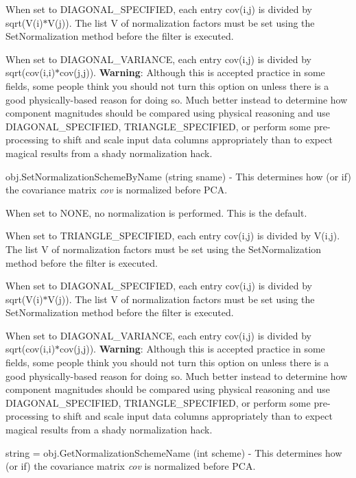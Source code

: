 \begin{DoxyItemize}
When set to D\-I\-A\-G\-O\-N\-A\-L\-\_\-\-S\-P\-E\-C\-I\-F\-I\-E\-D, each entry cov(i,j) is divided by sqrt(V(i)$\ast$\-V(j)). The list V of normalization factors must be set using the Set\-Normalization method before the filter is executed.

When set to D\-I\-A\-G\-O\-N\-A\-L\-\_\-\-V\-A\-R\-I\-A\-N\-C\-E, each entry cov(i,j) is divided by sqrt(cov(i,i)$\ast$cov(j,j)). {\bfseries Warning}\-: Although this is accepted practice in some fields, some people think you should not turn this option on unless there is a good physically-\/based reason for doing so. Much better instead to determine how component magnitudes should be compared using physical reasoning and use D\-I\-A\-G\-O\-N\-A\-L\-\_\-\-S\-P\-E\-C\-I\-F\-I\-E\-D, T\-R\-I\-A\-N\-G\-L\-E\-\_\-\-S\-P\-E\-C\-I\-F\-I\-E\-D, or perform some pre-\/processing to shift and scale input data columns appropriately than to expect magical results from a shady normalization hack.  
\item {\ttfamily obj.\-Set\-Normalization\-Scheme\-By\-Name (string sname)} -\/ This determines how (or if) the covariance matrix {\itshape cov} is normalized before P\-C\-A.

When set to N\-O\-N\-E, no normalization is performed. This is the default.

When set to T\-R\-I\-A\-N\-G\-L\-E\-\_\-\-S\-P\-E\-C\-I\-F\-I\-E\-D, each entry cov(i,j) is divided by V(i,j). The list V of normalization factors must be set using the Set\-Normalization method before the filter is executed.

When set to D\-I\-A\-G\-O\-N\-A\-L\-\_\-\-S\-P\-E\-C\-I\-F\-I\-E\-D, each entry cov(i,j) is divided by sqrt(V(i)$\ast$\-V(j)). The list V of normalization factors must be set using the Set\-Normalization method before the filter is executed.

When set to D\-I\-A\-G\-O\-N\-A\-L\-\_\-\-V\-A\-R\-I\-A\-N\-C\-E, each entry cov(i,j) is divided by sqrt(cov(i,i)$\ast$cov(j,j)). {\bfseries Warning}\-: Although this is accepted practice in some fields, some people think you should not turn this option on unless there is a good physically-\/based reason for doing so. Much better instead to determine how component magnitudes should be compared using physical reasoning and use D\-I\-A\-G\-O\-N\-A\-L\-\_\-\-S\-P\-E\-C\-I\-F\-I\-E\-D, T\-R\-I\-A\-N\-G\-L\-E\-\_\-\-S\-P\-E\-C\-I\-F\-I\-E\-D, or perform some pre-\/processing to shift and scale input data columns appropriately than to expect magical results from a shady normalization hack.  
\item {\ttfamily string = obj.\-Get\-Normalization\-Scheme\-Name (int scheme)} -\/ This determines how (or if) the covariance matrix {\itshape cov} is normalized before P\-C\-A.


\end{DoxyItemize}
